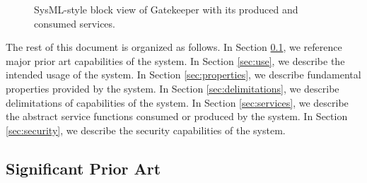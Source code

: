 \documentclass[a4paper]{arrowhead}
\begin{document}
\begin{figure}[ht!]
  \centering
  \caption{SysML-style block view of Gatekeeper with its produced and consumed services.}
  \label{fig:system}
\end{figure}

The rest of this document is organized as follows.
In Section \ref{sec:prior_art}, we reference major prior art capabilities of the system.
In Section \ref{sec:use}, we describe the intended usage of the system.
In Section \ref{sec:properties}, we describe fundamental properties provided by the system.
In Section \ref{sec:delimitations}, we describe delimitations of capabilities of the system.
In Section \ref{sec:services}, we describe the abstract service functions consumed or produced by the system.
In Section \ref{sec:security}, we describe the security capabilities of the system.

\newpage

\subsection{Significant Prior Art}
\label{sec:prior_art}
\end{document}
